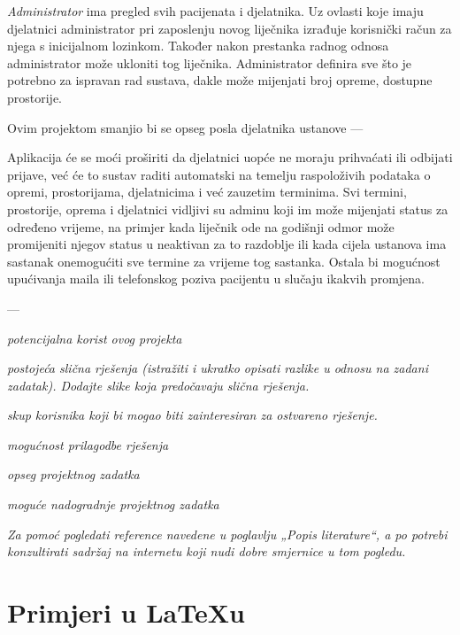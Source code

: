 		\textit{Administrator} ima pregled svih pacijenata i djelatnika. Uz ovlasti koje imaju djelatnici administrator pri zaposlenju novog liječnika izrađuje korisnički račun za njega s inicijalnom lozinkom. Također nakon prestanka radnog odnosa administrator može ukloniti tog liječnika. Administrator definira sve što je potrebno za ispravan rad sustava, dakle može mijenjati broj opreme, dostupne prostorije.
		
		Ovim projektom smanjio bi se opseg posla djelatnika ustanove 
		---
		
		Aplikacija će se moći proširiti da djelatnici uopće ne moraju prihvaćati ili odbijati prijave, već će to sustav raditi automatski na temelju raspoloživih podataka o opremi, prostorijama, djelatnicima i već zauzetim terminima. Svi termini, prostorije, oprema i djelatnici vidljivi su adminu koji im može mijenjati status za određeno vrijeme, na primjer kada liječnik ode na godišnji odmor može promijeniti njegov status u neaktivan za to razdoblje ili kada cijela ustanova ima sastanak onemogućiti sve termine za vrijeme tog sastanka. Ostala bi mogućnost upućivanja maila ili telefonskog poziva pacijentu u slučaju ikakvih promjena. 
		
		
		---
		
	
		
		\begin{packed_item}
			\item \textit{potencijalna korist ovog projekta}
			\item \textit{postojeća slična rješenja (istražiti i ukratko opisati razlike u odnosu na zadani zadatak). Dodajte slike koja predočavaju slična rješenja.}
			\item \textit{skup korisnika koji bi mogao biti zainteresiran za ostvareno rješenje.}
			\item \textit{mogućnost prilagodbe rješenja }
			\item \textit{opseg projektnog zadatka}
			\item \textit{moguće nadogradnje projektnog zadatka}
		\end{packed_item}
		
		\textit{Za pomoć pogledati reference navedene u poglavlju „Popis literature“, a po potrebi konzultirati sadržaj na internetu koji nudi dobre smjernice u tom pogledu.}
		\eject
		
		\section{Primjeri u \LaTeX u}
		
